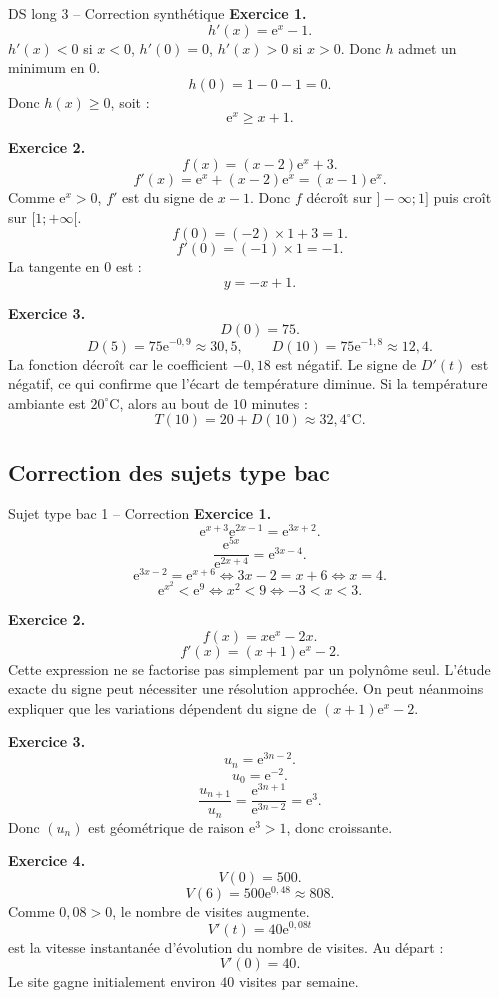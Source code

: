 \documentclass[11pt,a4paper]{article}
\newcommand{\e}{\mathrm{e}}
\begin{document}
\begin{correctionbox}{DS long 3 -- Correction synthétique}
\textbf{Exercice 1.}
\[
h'(x)=\e^x-1.
\]
$h'(x)<0$ si $x<0$, $h'(0)=0$, $h'(x)>0$ si $x>0$.
Donc $h$ admet un minimum en $0$.
\[
h(0)=1-0-1=0.
\]
Donc $h(x)\geq0$, soit :
\[
\e^x\geq x+1.
\]

\medskip

\textbf{Exercice 2.}
\[
f(x)=(x-2)\e^x+3.
\]
\[
f'(x)=\e^x+(x-2)\e^x=(x-1)\e^x.
\]
Comme $\e^x>0$, $f'$ est du signe de $x-1$.
Donc $f$ décroît sur $]-\infty;1]$ puis croît sur $[1;+\infty[$.
\[
f(0)=(-2)\times1+3=1.
\]
\[
f'(0)=(-1)\times1=-1.
\]
La tangente en $0$ est :
\[
y=-x+1.
\]

\medskip

\textbf{Exercice 3.}
\[
D(0)=75.
\]
\[
D(5)=75\e^{-0,9}\approx30,5,
\qquad
D(10)=75\e^{-1,8}\approx12,4.
\]
La fonction décroît car le coefficient $-0,18$ est négatif. Le signe de $D'(t)$ est négatif, ce qui confirme que l'écart de température diminue. Si la température ambiante est $20^\circ$C, alors au bout de $10$ minutes :
\[
T(10)=20+D(10)\approx32,4^\circ\mathrm{C}.
\]
\end{correctionbox}

\subsection{Correction des sujets type bac}

\begin{correctionbox}{Sujet type bac 1 -- Correction}
\textbf{Exercice 1.}
\[
\e^{x+3}\e^{2x-1}=\e^{3x+2}.
\]
\[
\frac{\e^{5x}}{\e^{2x+4}}=\e^{3x-4}.
\]
\[
\e^{3x-2}=\e^{x+6}
\Longleftrightarrow 3x-2=x+6
\Longleftrightarrow x=4.
\]
\[
\e^{x^2}<\e^9
\Longleftrightarrow x^2<9
\Longleftrightarrow -3<x<3.
\]

\medskip

\textbf{Exercice 2.}
\[
f(x)=x\e^x-2x.
\]
\[
f'(x)=(x+1)\e^x-2.
\]
Cette expression ne se factorise pas simplement par un polynôme seul. L'étude exacte du signe peut nécessiter une résolution approchée. On peut néanmoins expliquer que les variations dépendent du signe de $(x+1)\e^x-2$.

\medskip

\textbf{Exercice 3.}
\[
u_n=\e^{3n-2}.
\]
\[
u_0=\e^{-2}.
\]
\[
\frac{u_{n+1}}{u_n}
=
\frac{\e^{3n+1}}{\e^{3n-2}}
=
\e^3.
\]
Donc $(u_n)$ est géométrique de raison $\e^3>1$, donc croissante.

\medskip

\textbf{Exercice 4.}
\[
V(0)=500.
\]
\[
V(6)=500\e^{0,48}\approx808.
\]
Comme $0,08>0$, le nombre de visites augmente.
\[
V'(t)=40\e^{0,08t}
\]
est la vitesse instantanée d'évolution du nombre de visites. Au départ :
\[
V'(0)=40.
\]
Le site gagne initialement environ $40$ visites par semaine.
\end{correctionbox}
\end{document}
